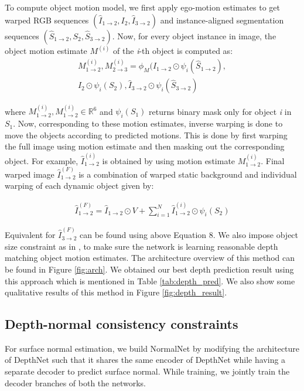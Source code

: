 \documentclass[10pt,twocolumn,letterpaper]{article}
\begin{document}
\noindent To compute object motion model, we first apply ego-motion estimates to get warped RGB sequences $(\hat I_{1\rightarrow2}, I_{2}, \hat I_{3\rightarrow2})$ and instance-aligned segmentation sequences $(\hat S_{1\rightarrow2}, S_{2}, \hat S_{3\rightarrow2})$. Now, for every object instance in image, the object motion estimate $M^{(i)}$ of the \textit{i}-th object is computed as:
\begin{multline}
        M_{1\rightarrow2}^{(i)}, M_{2\rightarrow3}^{(i)} = \phi_{M}(\hat I_{1\rightarrow2} \odot \psi_{i}(\hat S_{1\rightarrow2}),
    \\
    I_{2} \odot \psi_{i}(S_{2}), \hat I_{3\rightarrow2} \odot \psi_{i}(\hat S_{3\rightarrow2})
\end{multline}

\noindent where $M_{1\rightarrow2}^{(i)}, M_{1\rightarrow2}^{(i)} \in \mathbb{R}^{6}$ and $\psi_{i}(S_{1})$ returns binary mask only for object \textit{i} in  $S_{1}$. Now, corresponding to these motion estimates, inverse warping is done to move the objects according to predicted motions. This is done by first warping the full image using motion estimate and then masking out the corresponding object. For example, $\hat I_{1\rightarrow2}^{(i)}$ is obtained by using motion estimate $M_{1\rightarrow2}^{(i)}$. Final warped image  $\hat I_{1\rightarrow2}^{(F)}$ is a combination of warped static background and individual warping of each dynamic object given by:

\begin{multline}
\hat I_{1\rightarrow2}^{(F)} = \hat I_{1\rightarrow2} \odot V + \sum_{i=1}^{N} \hat I_{1\rightarrow2}^{(i)} \odot \psi_{i}(S_{2})
\end{multline}

\noindent Equivalent for $\hat I_{3\rightarrow2}^{(F)}$ can be found using above Equation 8. We also impose object size constraint as in \cite{casser2018depth}, to make sure the network is learning reasonable depth matching object motion estimates. The architecture overview of this method can be found in Figure \ref{fig:arch}. We obtained our best depth prediction result using this approach which is mentioned in Table \ref{tab:depth_pred}. We also show some qualitative results of this method in Figure \ref{fig:depth_result}.

\subsection{Depth-normal consistency constraints}
For surface normal estimation, we build NormalNet by modifying the architecture of DepthNet such that it shares the same encoder of DepthNet while having a separate decoder to predict surface normal. While training, we jointly train the decoder branches of both the networks. 
\end{document}
